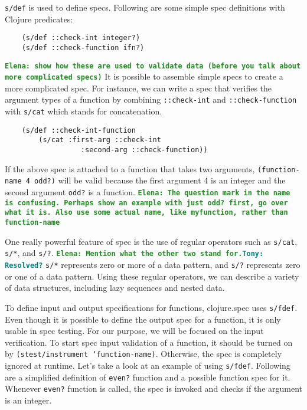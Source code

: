 \documentclass[12pt]{article}
\newcommand{\comment}[1]{{\bf \tt  {#1}}}
\newcommand{\emcomment}[1]{\textcolor{ForestGreen}{\comment{Elena: {#1}}}}
\newcommand{\tscomment}[1]{\textcolor{Teal}{\comment{Tony: {#1}}}}
\begin{document}
	\texttt{s/def} is used to define specs. Following are 
	some simple spec definitions with Clojure predicates:
	\begin{verbatim}
	(s/def ::check-int integer?)
	(s/def ::check-function ifn?)
	\end{verbatim}
	\emcomment{show how these are used to validate data (before you talk about more complicated specs)}
	It is possible to assemble simple specs to create a more complicated spec. For instance, we can write a spec that verifies 
	the argument types of a function by combining \texttt{::check-int} and \texttt{::check-function} with \texttt{s/cat} 
	which stands for concatenation. 
	\begin{verbatim}
	(s/def ::check-int-function 
		(s/cat :first-arg ::check-int 
		          :second-arg ::check-function))
	\end{verbatim}
	If the above spec is attached to a function that takes two arguments, {\tt (function-name 4 odd?)} will be valid because 
	the first argument 4 is an integer and the second argument {\tt odd?} is a function.
	\emcomment{The question mark in the name is confusing. Perhaps show an example with just odd? first, go over what it is. 
	Also use some actual name, like myfunction, rather than function-name}
	
	One really powerful feature of spec is the use of regular operators such as \texttt{s/cat}, \texttt{s/*}, and \texttt{s/?}. 
	\emcomment{Mention what the other two stand for.}\tscomment{Resolved?}
	\texttt{s/*} represents zero or more of a data pattern, and \texttt{s/?} represents zero or one of a data pattern.
	Using these regular operators, we can describe a variety of data structures, including lazy sequences and nested data. 

	To define input and output specifications for functions, clojure.spec uses \texttt{s/fdef}. Even though it is possible to 
	define the output spec for a function, it is only usable in spec testing. For our purpose, we will be focused on the input 
	verification. To start spec input validation of a function, it should be turned on by \texttt{(stest/instrument `function-name)}. 
	Otherwise, the spec is completely ignored at runtime. Let's take a look at an example of using \texttt{s/fdef}. Following 
	are a simplified definition of \texttt{even?} function and a possible function spec for it. Whenever \texttt{even?} function
	is called, the spec is invoked and checks if the argument is an integer.
	
\end{document}
